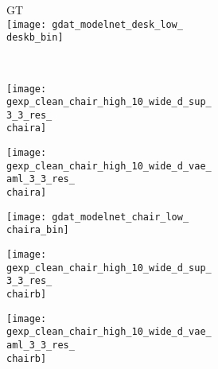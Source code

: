 \begin{figure}[t]
{\begin{subfigure}[t]{0.5\textwidth}
\begin{subfigure}[t]{0.15\textwidth}
    	\end{subfigure}
    	\begin{subfigure}[t]{0.15\textwidth}
    		\vspace{0px}\centering
    		GT\\
    		\texttt{[image: gdat\_modelnet\_desk\_low\_\\deskb\_bin]}
    	\end{subfigure}
    	\\[-2px]
        \hspace*{-6px}
    	\begin{subfigure}[t]{0.15\textwidth}
    		\vspace{0px}\centering
    		\texttt{[image: gexp\_clean\_chair\_high\_10\_wide\_d\_sup\_3\_3\_res\_\\chaira]}
    	\end{subfigure}
    	\begin{subfigure}[t]{0.15\textwidth}
    		\vspace{0px}\centering
    		\texttt{[image: gexp\_clean\_chair\_high\_10\_wide\_d\_vae\_aml\_3\_3\_res\_\\chaira]}
    	\end{subfigure}
    	\begin{subfigure}[t]{0.15\textwidth}
    		\vspace{0px}\centering
    		\texttt{[image: gdat\_modelnet\_chair\_low\_\\chaira\_bin]}
    	\end{subfigure}
    	\begin{subfigure}[t]{0.15\textwidth}
    		\vspace{0px}\centering
    		\texttt{[image: gexp\_clean\_chair\_high\_10\_wide\_d\_sup\_3\_3\_res\_\\chairb]}
    	\end{subfigure}
    	\begin{subfigure}[t]{0.15\textwidth}
    		\vspace{0px}\centering
    		\texttt{[image: gexp\_clean\_chair\_high\_10\_wide\_d\_vae\_aml\_3\_3\_res\_\\chairb]}

\end{subfigure}
\end{subfigure}}
\end{figure}
